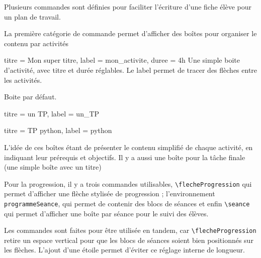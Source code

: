 \label{plan_de_travail}


Plusieurs commandes sont définies pour faciliter l'écriture d'une fiche élève pour un plan de travail.

La première catégorie de commande permet d'afficher des boîtes pour organiser le contenu par activités
\begin{boiteCodeTex}{}
  \begin{activite}{titre = Mon super titre, label = mon_activite, duree = 4h}
    Une simple boite d'activité, avec titre et durée réglables. Le label permet de tracer des flèches entre les activités.
  \end{activite}

  \begin{activite}{}
    Boite par défaut.
  \end{activite}

  \begin{TP}{titre = un TP, label = un_TP}
  \end{TP}

  \begin{TPNumerique}{titre = TP python, label = python}
  \end{TPNumerique}

  \phantom{b}
\end{boiteCodeTex}

L'idée de ces boîtes étant de présenter le contenu simplifié de chaque activité, en indiquant leur prérequis et objectifs.
Il y a aussi une boîte pour la tâche finale (une simple boîte avec un titre)
\begin{boiteCodeTex}{}
  \begin{tacheFinale} \end{tacheFinale}
\end{boiteCodeTex}

Pour la progression, il y a trois commandes utilisables, \lstinline|\flecheProgression| qui permet d'afficher une flèche stylisée de progression ; l'environnement \lstinline|programmeSeance|, qui permet de contenir des blocs de séances et enfin \lstinline|\seance| qui permet d'afficher une boîte par séance pour le suivi des élèves.

\begin{boiteCodeTex}{}
  
  \begin{programmeSeance}[nombre = 2]
    \seance \seance
  \end{programmeSeance}
  \begin{programmeSeance}[nombre = 2, distance = 0pt]
    \seance {}
  \end{programmeSeance}
\end{boiteCodeTex}
Les commandes sont faites pour être utilisée en tandem, car \lstinline|\flecheProgression| retire un espace vertical pour que les blocs de séances soient bien positionnés sur les flèches.
L'ajout d'une étoile permet d'éviter ce réglage interne de longueur.

